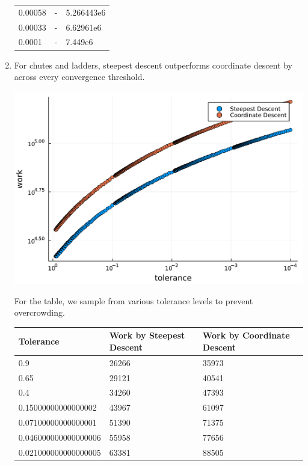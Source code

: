 \documentclass[]{exam}
\begin{document}
\begin{questions}
\begin{enumerate}[label=\arabic*.]
\begin{table}[]
\begin{tabular}{@{}lll@{}}
				0.00058               & -                        & 5.266443e6                 \\
				0.00033               & -                        & 6.62961e6                  \\
				0.0001                & -                        & 7.449e6					  \\
				\bottomrule
			\end{tabular}
		\end{table}
	\item For chutes and ladders, steepest descent outperforms coordinate descent by across every convergence threshold.
		\begin{center}
			\includegraphics[width=.7\textwidth]{code/q8-1.pdf}
		\end{center}
		For the table, we sample from various tolerance levels to prevent overcrowding.
		\begin{table}[]
			\centering
			\begin{tabular}{@{}lll@{}}
				\toprule
				Tolerance             & Work by Steepest Descent & Work by Coordinate Descent \\ \midrule
				0.9                   & 26266                    & 35973                      \\
				0.65                  & 29121                    & 40541                      \\
				0.4                   & 34260                    & 47393                      \\
				0.15000000000000002   & 43967                    & 61097                      \\
				0.07100000000000001   & 51390                    & 71375                      \\
				0.046000000000000006  & 55958                    & 77656                      \\
				0.021000000000000005  & 63381                    & 88505                      \\

\end{tabular}
\end{table}
\end{enumerate}
\end{questions}
\end{document}
